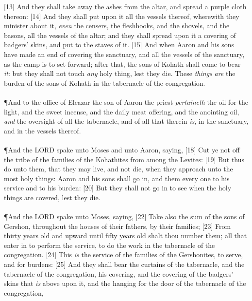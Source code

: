 [13] \textcolor[cmyk]{0.99998,1,0,0}{And they shall take away the ashes from the altar, and spread a purple cloth thereon:}
[14] \textcolor[cmyk]{0.99998,1,0,0}{And they shall put upon it all the vessels thereof, wherewith they minister about it, \emph{even} the censers, the fleshhooks, and the shovels, and the basons, all the vessels of the altar; and they shall spread upon it a covering of badgers' skins, and put to the staves of it.}
[15] \textcolor[cmyk]{0.99998,1,0,0}{And when Aaron and his sons have made an end of covering the sanctuary, and all the vessels of the sanctuary, as the camp is to set forward; after that, the sons of Kohath shall come to bear \emph{it}: but they shall not touch \emph{any} holy thing, lest they die. These \emph{things} \emph{are} the burden of the sons of Kohath in the tabernacle of the congregation.}\\
\\
\P \textcolor[cmyk]{0.99998,1,0,0}{And to the office of Eleazar the son of Aaron the priest \emph{pertaineth} the oil for the light, and the sweet incense, and the daily meat offering, and the anointing oil, \emph{and} the oversight of all the tabernacle, and of all that therein \emph{is}, in the sanctuary, and in the vessels thereof.}\\
\\
\P \textcolor[cmyk]{0.99998,1,0,0}{And the LORD spake unto Moses and unto Aaron, saying,}
[18] \textcolor[cmyk]{0.99998,1,0,0}{Cut ye not off the tribe of the families of the Kohathites from among the Levites:}
[19] \textcolor[cmyk]{0.99998,1,0,0}{But thus do unto them, that they may live, and not die, when they approach unto the most holy things: Aaron and his sons shall go in, and  them every one to his service and to his burden:}
[20] \textcolor[cmyk]{0.99998,1,0,0}{But they shall not go in to see when the holy things are covered, lest they die.}\\
\\
\P \textcolor[cmyk]{0.99998,1,0,0}{And the LORD spake unto Moses, saying,}
[22] \textcolor[cmyk]{0.99998,1,0,0}{Take also the sum of the sons of Gershon, throughout the houses of their fathers, by their families;}
[23] \textcolor[cmyk]{0.99998,1,0,0}{From thirty years old and upward until fifty years old shalt thou number them; all that enter in to perform the service, to do the work in the tabernacle of the congregation.}
[24] \textcolor[cmyk]{0.99998,1,0,0}{This \emph{is} the service of the families of the Gershonites, to serve, and for burdens:}
[25] \textcolor[cmyk]{0.99998,1,0,0}{And they shall bear the curtains of the tabernacle, and the tabernacle of the congregation, his covering, and the covering of the badgers' skins that \emph{is} above upon it, and the hanging for the door of the tabernacle of the congregation,}
